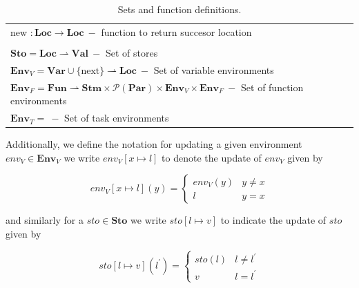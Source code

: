 \begin{table}[htb!]
\begin{tabular}{l}
    new $: \textbf{Loc} \rightarrow \textbf{Loc}\ -$ function to return succesor location                                                                                      \\
    \\
    $\textbf{Sto} = \textbf{Loc} \rightharpoonup \textbf{Val}\ -$ Set of stores                                                                                                \\
    $\textbf{Env}_V = \textbf{Var} \cup \{\text{next}\} \rightharpoonup \textbf{Loc}\ -$ Set of variable environments                                                          \\
    $\textbf{Env}_F = \textbf{Fun} \rightharpoonup \textbf{Stm} \times \mathcal{P} (\textbf{Par}) \times \textbf{Env}_V \times \textbf{Env}_F\ -$ Set of function environments \\
    $\textbf{Env}_T = \ -$ Set of task environments                                                                                                                            \\
    \bottomrule
  \end{tabular}
  \caption{Sets and function definitions.}
  \label{tab:setsandfunctions}
\end{table}



Additionally, we define the notation for updating a given environment $env_V \in \textbf{Env}_V$ we write $env_V[ x \mapsto l]$ to denote the update of $env_V$ given by


\begin{equation}
  env_V[x \mapsto l](y) =
  \begin{cases}
    env_V(y) & y \neq x \\
    l        & y = x
  \end{cases}
\end{equation}


and similarly for a $sto \in \textbf{Sto}$ we write $sto[ l \mapsto v ]$ to indicate the update of $sto$ given by


\begin{equation}
  sto[l \mapsto v](l^\prime) =
  \begin{cases}
    sto(l) & l \neq l^\prime \\
    v      & l = l^\prime
  \end{cases}
\end{equation}


